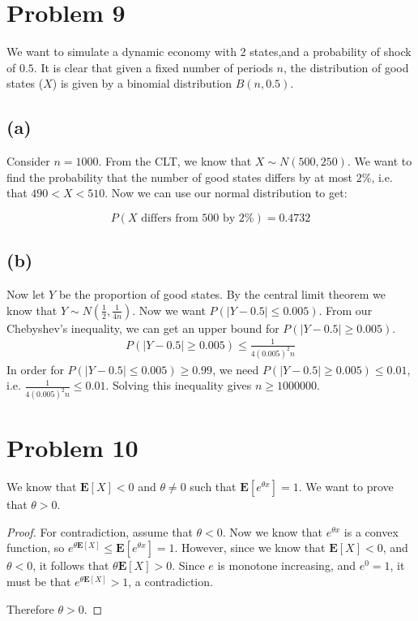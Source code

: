 \documentclass{article}
\begin{document}
	\section*{Problem 9}
	We want to simulate a dynamic economy with 2 states,and a probability of shock of $0.5$. It is clear that given a fixed number of periods $n$, the distribution of good states ($X$) is given by a binomial distribution $B(n,0.5)$.  
	
	\subsection*{(a)}
	Consider $n = 1000$. From the CLT, we know that $X \sim N(500, 250)$. We want to find the probability that the number of good states differs by at most $2\%$, i.e. that $ 490 < X < 510$. Now we can use our normal distribution to get:
	
	\[ P(X \text{ differs from 500 by $2\%$} ) = 0.4732 \]
	
	\subsection*{(b)}
	Now let $Y$ be the proportion of good states. By the central limit theorem we know that $Y \sim N(\frac{1}{2}, \frac{1}{4n})$. Now we want $P(|Y-0.5|\leq 0.005)$. From our Chebyshev's inequality, we can get an upper bound for $P(|Y- 0.5 |\geq 0.005)$. 
	\begin{align*}
	P(|Y- 0.5 |\geq 0.005) \leq \frac{1}{4(0.005)^2 n}
	\end{align*}
	In order for $P(|Y-0.5| \leq 0.005) \geq 0.99$, we need $P(|Y - 0.5| \geq 0.005) \leq 0.01$, i.e. $\frac{1}{4(0.005)^2 n} \leq 0.01$. Solving this inequality gives $n \geq 1000000$. 
	
	\section*{Problem 10}
	We know that $\mathbf{E}[X] < 0$ and $\theta \neq 0$ such that $\mathbf{E}[e^{\theta x}] = 1$. We want to prove that $\theta > 0$. 
	
	\begin{proof}
	For contradiction, assume that $\theta < 0$. Now we know that $e^{\theta x}$ is a convex function, so $e^{\theta \mathbf{E}[X]} \leq \mathbf{E}[e^{\theta x}] =1$. However, since we know that $\mathbf{E}[X] < 0$, and $\theta < 0$, it follows that $\theta \mathbf{E}[X] > 0$. Since $e$ is monotone increasing, and $e^0 = 1$, it must be that $e^{\theta \mathbf{E}[X]} > 1$, a contradiction. 
	
	Therefore $\theta > 0$.  
	\end{proof}
\end{document}
